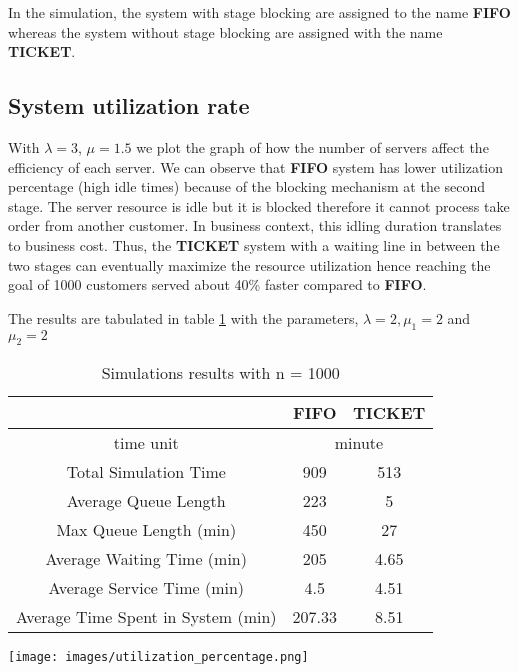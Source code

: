 In the simulation, the system with stage blocking are assigned to the name \textbf{FIFO} whereas the system without stage blocking are assigned with the name \textbf{TICKET}.
\subsection{System utilization rate}
With $\lambda = 3$, $\mu = 1.5$ we plot the graph of how the number of servers affect the efficiency of each server. We can observe that \textbf{FIFO} system has lower utilization percentage (high idle times) because of the blocking mechanism at the second stage. The server resource is idle but it is blocked therefore it cannot process take order from another customer. In business context, this idling duration translates to business cost. Thus, the \textbf{TICKET} system with a waiting line in between the two stages can eventually maximize the resource utilization hence reaching the goal of 1000 customers served about 40\% faster compared to \textbf{FIFO}. 

The results are tabulated in table \ref{Tab:MainResults} with the parameters, $\lambda = 2, \mu_1 = 2 $ and $\mu_2 = 2$ 


	\begin{table}[ht]
		\caption{Simulations results with n = 1000}
		\begin{center}
 \begin{tabular}{|c|c|c|}
 	\hline
 	& \textbf{FIFO} & \textbf{TICKET}\\
 	\hline
 	time unit & \multicolumn{2}{c|}{minute}\\
 	\hline
 	Total Simulation Time & 909 & 513 \\
 	\hline
 	Average Queue Length & 223 & 5 \\
 	\hline
 	Max Queue Length (min) & 450 & 27 \\
 	\hline
 	Average Waiting Time (min) & 205 & 4.65 \\
 	\hline
 	Average Service Time (min) & 4.5 & 4.51 \\
 	\hline
 	Average Time Spent in System (min) & 207.33 & 8.51 \\
 	\hline
 \end{tabular}
\label{Tab:MainResults}
\end{center}
\end{table}

\noindent

\begin{minipage}{\textwidth}
	\begin{center}
    \texttt{[image: images/utilization\_percentage.png]}
    \label{utilization_percentage}

\end{center}
\end{minipage}

